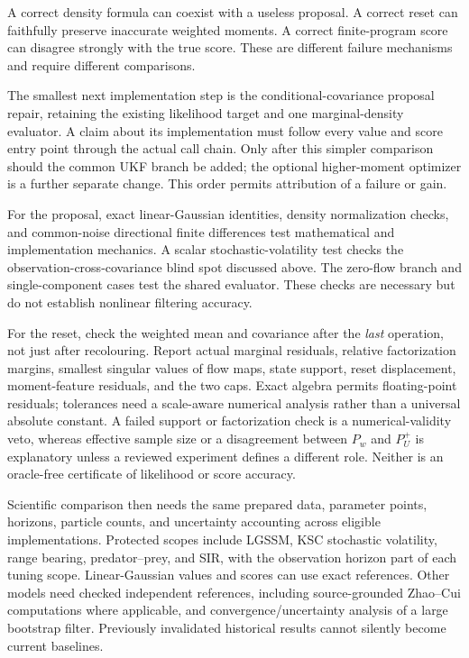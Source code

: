 A correct density formula can coexist with a useless proposal. A correct
reset can faithfully preserve inaccurate weighted moments. A correct
finite-program score can disagree strongly with the true score. These
are different failure mechanisms and require different comparisons.

The smallest next implementation step is the conditional-covariance
proposal repair, retaining the existing likelihood target and one
marginal-density evaluator. A claim about its implementation must follow
every value and score entry point through the actual call chain.
Only after this simpler comparison should the common UKF branch be added;
the optional higher-moment optimizer is a further separate change.
This order permits attribution of a failure or gain.

For the proposal, exact linear-Gaussian identities, density normalization
checks, and common-noise directional finite differences test mathematical
and implementation mechanics. A scalar stochastic-volatility test checks
the observation-cross-covariance blind spot discussed above. The zero-flow
branch and single-component cases test the shared evaluator. These checks
are necessary but do not establish nonlinear filtering accuracy.

For the reset, check the weighted mean and covariance after the \emph{last}
operation, not just after recolouring. Report actual marginal residuals,
relative factorization margins, smallest singular values of flow maps,
state support, reset displacement, moment-feature residuals, and the two
caps. Exact algebra permits floating-point residuals; tolerances need a
scale-aware numerical analysis rather than a universal absolute constant.
A failed support or factorization check is a numerical-validity veto,
whereas effective sample size or a disagreement between \(P_w\) and
\(P_U^+\) is explanatory unless a reviewed experiment defines a different
role. Neither is an oracle-free certificate of likelihood or score accuracy.

Scientific comparison then needs the same prepared data, parameter points,
horizons, particle counts, and uncertainty accounting across eligible
implementations. Protected scopes include LGSSM, KSC stochastic volatility,
range bearing, predator--prey, and SIR, with the observation horizon part of
each tuning scope. Linear-Gaussian values and scores can use exact references.
Other models need checked independent references, including source-grounded
Zhao--Cui computations where applicable, and convergence/uncertainty analysis
of a large bootstrap filter. Previously invalidated historical results
cannot silently become current baselines.

